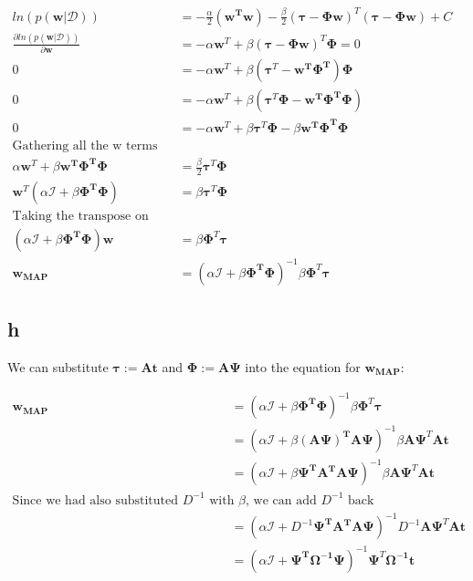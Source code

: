 \documentclass[a4paper]{article}
\begin{document}
\begin{align*}
    ln(p(\pmb{w}|\mathcal{D})) &= - \frac{\alpha}{2}(\pmb{w^Tw}) - \frac{\beta}{2}(\pmb{\tau}- \pmb{\Phi w})^{T}(\pmb{\tau}- \pmb{\Phi w}) + C \\
    \frac{\partial ln(p(\pmb{w}|\mathcal{D}))}{\partial \pmb{w}} &= -\alpha \pmb{w}^T + \beta(\pmb{\tau}-\pmb{\Phi w})^T \pmb{\Phi} = 0 \\
    0 &= -\alpha \pmb{w}^T + \beta(\pmb{\tau}^T -\pmb{w^T \Phi^T}) \pmb{\Phi}  \\
    0 &= -\alpha \pmb{w}^T + \beta(\pmb{\tau}^T\pmb{\Phi}  -\pmb{w^T \Phi^T}\pmb{\Phi} )  \\
    0 &= -\alpha \pmb{w}^T + \beta\pmb{\tau}^T\pmb{\Phi}  -\beta\pmb{w^T \Phi^T}\pmb{\Phi}  \\
    \text{Gathering all the w terms together:} && \\
    \alpha \pmb{w}^T +\beta\pmb{w^T \Phi^T}\pmb{\Phi} &= \frac{\beta}{2}\pmb{\tau}^T\pmb{\Phi}    \\
   \pmb{w}^T (\alpha\mathcal{I} +\beta\pmb{\Phi^T}\pmb{\Phi}) &= \beta\pmb{\tau}^T\pmb{\Phi}    \\
   \text{Taking the transpose on both sides:} && \\
   (\alpha\mathcal{I} +\beta\pmb{\Phi^T}\pmb{\Phi})\pmb{w} &= \beta\pmb{\Phi}^T \pmb{\tau}   \\
   \pmb{w_{MAP}} &= (\alpha\mathcal{I} +\beta\pmb{\Phi^T}\pmb{\Phi})^{-1}\beta\pmb{\Phi}^T \pmb{\tau} 
\end{align*}{}

\subsection*{h}
We can substitute  $\pmb{\tau :=At} $ and $\pmb{\Phi :=A\Psi}$ into the equation for $\pmb{w_{MAP}}$:

\begin{align*}
    \pmb{w_{MAP}} &= (\alpha\mathcal{I} +\beta\pmb{\Phi^T}\pmb{\Phi})^{-1}\beta\pmb{\Phi}^T \pmb{\tau} \\
    &= (\alpha\mathcal{I} +\beta\pmb{(A\Psi)^T}\pmb{A\Psi})^{-1}\beta\pmb{A\Psi}^T \pmb{At} \\
    &= (\alpha\mathcal{I} +\beta\pmb{\Psi^TA^T}\pmb{A\Psi})^{-1}\beta\pmb{A\Psi}^T \pmb{At} \\
    \text{Since we had also substituted $D^{-1}$ with $\beta$, we can add $D^{-1}$ back}\\
    &= (\alpha\mathcal{I} +D^{-1}\pmb{\Psi^TA^T}\pmb{A\Psi})^{-1}D^{-1}\pmb{A\Psi}^T \pmb{At} \\
    &= (\alpha\mathcal{I} +\pmb{\Psi^T\Omega^{-1}\Psi})^{-1}\pmb{\Psi}^T \pmb{\Omega^{-1} t} \\
\end{align*}{}
\end{document}
